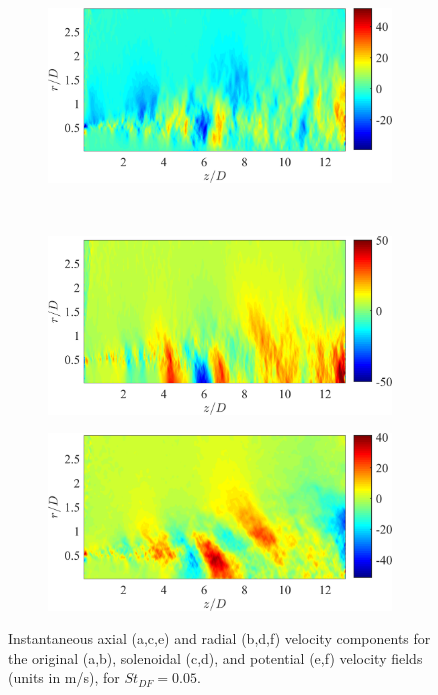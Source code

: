 \begin{figure}
\begin{subfigure}{0.5\textwidth}
		\caption{}
	\end{subfigure}%
	\begin{subfigure}{0.5\textwidth}
		\centering
		\includegraphics[width=0.95\linewidth]{Figures/ch5_valid_Inst_solUr.png}
		\caption{}
	\end{subfigure}\\
	\begin{subfigure}{0.5\textwidth}
		\centering
		\includegraphics[width=0.95\linewidth]{Figures/ch5_valid_Inst_potUz.png}
		\caption{}
	\end{subfigure}%
	\begin{subfigure}{0.5\textwidth}
		\centering
		\includegraphics[width=0.95\linewidth]{Figures/ch5_valid_Inst_potUr.png}
		\caption{}
	\end{subfigure}
	\caption{Instantaneous axial (a,c,e) and radial (b,d,f) velocity components for the original (a,b), solenoidal (c,d), and potential (e,f) velocity fields (units in m/s), for $St_{DF} = 0.05.$}
	\label{fig:valid_helmholtz}
\end{figure}

